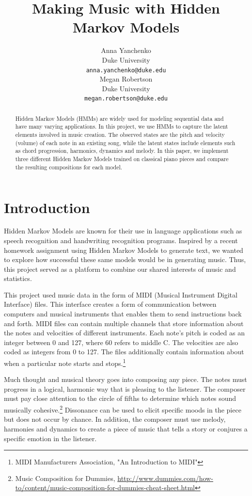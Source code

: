 \documentclass{article} %
\title{Making Music with Hidden Markov Models}
\author{
Anna Yanchenko \\
Duke University\\
\texttt{anna.yanchenko@duke.edu} \\
\And
Megan Robertson \\
Duke University \\
\texttt{megan.robertson@duke.edu} \\
}
\begin{document}
\maketitle

\begin{abstract}
Hidden Markov Models (HMMs) are widely used  for modeling sequential data and have many varying applications.  In this project, we use HMMs to capture the latent elements involved in music creation. The observed states are the pitch and velocity (volume) of each note in an existing  song, while the latent states include elements such as chord progression, harmonics, dynamics and melody.  In this paper, we implement three different Hidden Markov Models trained on classical piano pieces and compare the resulting compositions for each model. 
\end{abstract}
 
\section{Introduction}

Hidden Markov Models are known for their use in language applications such as speech recognition and handwriting recognition programs. Inspired by a recent homework assignment using Hidden Markov Models to generate text, we wanted to explore how successful these same models would be in generating music. Thus, this project served as a platform to combine our shared interests of music and statistics. 

This project used music data in the form of MIDI (Musical Instrument Digital Interface) files. This interface creates a form of communication between computers and musical instruments that enables them to send instructions back and forth. MIDI files can contain multiple channels that store information about the notes and velocities of different instruments.   Each note's pitch is coded as an integer between 0 and 127, where 60 refers to middle C.  The velocities are also coded as integers from 0 to 127. The files additionally contain information about when a particular note starts and stops.\footnote{MIDI Manufacturers Association, "An Introduction to MIDI"} 


Much thought and musical theory goes into composing any piece.  The notes must progress in a logical, harmonic way that is pleasing to the listener. The composer must pay close attention to the circle of fifths to determine which notes sound musically cohesive.\footnote{Music Composition for Dummies, \url{http://www.dummies.com/how-to/content/music-composition-for-dummies-cheat-sheet.html}}  Dissonance can be used to elicit specific moods in the piece but does not occur by chance.  In addition, the composer must use melody, harmonies and dynamics to create a piece of music that tells a story or conjures a specific emotion in the listener.
\end{document}
